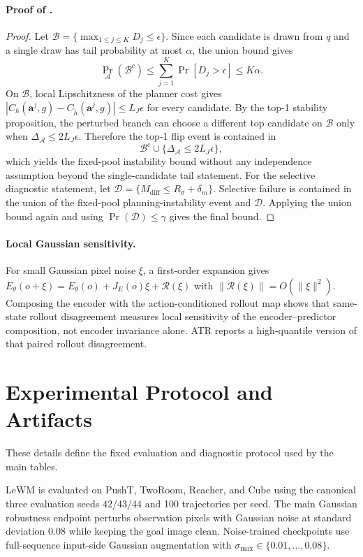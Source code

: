 \documentclass[10pt]{article}
\newcommand{\stdmax}{\ensuremath{\sigma_{\max}}}
\begin{document}
\paragraph{Proof of .}
\begin{proof}
Let $\mathcal B=\{\max_{1\le j\le K} D_j\le\epsilon\}$. Since each candidate is drawn from $q$ and a single draw has tail probability at most $\alpha$, the union bound gives
\[
\Pr_{\mathcal A}(\mathcal B^c)
\le
\sum_{j=1}^K \Pr[D_j>\epsilon]
\le K\alpha .
\]
On $\mathcal B$, local Lipschitzness of the planner cost gives $|C_h(\mathbf a^j,g)-C_{\tilde h}(\mathbf a^j,g)|\le L_J\epsilon$ for every candidate. By the top-1 stability proposition, the perturbed branch can choose a different top candidate on $\mathcal B$ only when $\Delta_{\mathcal A}\le 2L_J\epsilon$. Therefore the top-1 flip event is contained in
\[
\mathcal B^c \cup \{\Delta_{\mathcal A}\le 2L_J\epsilon\},
\]
which yields the fixed-pool instability bound without any independence assumption beyond the single-candidate tail statement.
For the selective diagnostic statement, let $\mathcal D=\{M_{\mathrm{diff}}\le R_\sigma+\delta_m\}$. Selective failure is contained in the union of the fixed-pool planning-instability event and $\mathcal D$. Applying the union bound again and using $\Pr(\mathcal D)\le\gamma$ gives the final bound.
\end{proof}

\paragraph{Local Gaussian sensitivity.}
For small Gaussian pixel noise $\xi$, a first-order expansion gives
$E_\theta(o+\xi)=E_\theta(o)+J_E(o)\xi+\mathcal R(\xi)$ with $\|\mathcal R(\xi)\|=O(\|\xi\|^2)$.
Composing the encoder with the action-conditioned rollout map shows that same-state rollout disagreement measures local sensitivity of the encoder--predictor composition, not encoder invariance alone. ATR reports a high-quantile version of that paired rollout disagreement.

\section{Experimental Protocol and Artifacts}\label{sec:appendix-A}

These details define the fixed evaluation and diagnostic protocol used by the main tables.

LeWM is evaluated on PushT, TwoRoom, Reacher, and Cube using the canonical three evaluation seeds 42/43/44 and 100 trajectories per seed. The main Gaussian robustness endpoint perturbs observation pixels with Gaussian noise at standard deviation 0.08 while keeping the goal image clean. Noise-trained checkpoints use full-sequence input-side Gaussian augmentation with $\stdmax{}\in\{0.01,\ldots,0.08\}$.
\end{document}
